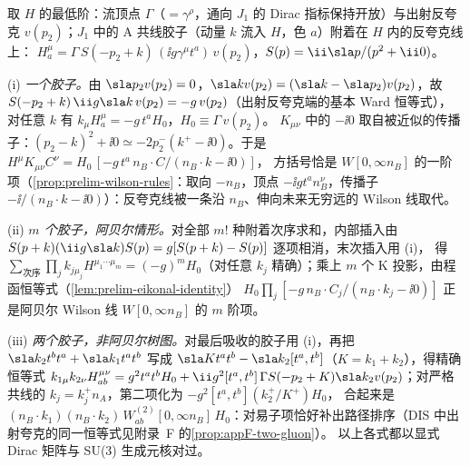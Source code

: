 \begin{example}\label{ex:sudakov-ward-wilson}
取 $H$ 的最低阶：流顶点 $\Gamma$（$=\gamma^\rho$，通向 $J_1$ 的 Dirac 指标保持开放）与出射反夸克 $v(p_2)$；$J_1$ 中的 A 共线胶子（动量 $k$ 流入 $H$，色 $a$）附着在 $H$ 内的反夸克线上：
$H^\mu_a=\Gamma\,S(-p_2+k)\,(\ii g\gamma^\mu t^a)\,v(p_2)$，$S(p)=\ii\sla p/(p^2+\ii0)$。

(i) \emph{一个胶子。}由 $\sla p_2v(p_2)=0$，$\sla kv(p_2)=(\sla k-\sla p_2)v(p_2)$，故 $S(-p_2+k)\,\ii g\sla k\,v(p_2)=-g\,v(p_2)$（出射反夸克端的基本 Ward 恒等式），
对任意 $k$ 有 $k_\mu H^\mu_a=-g\,t^aH_0$，$H_0\equiv\Gamma\,v(p_2)$。%
$K_{\mu\nu}$ 中的 $-\ii0$ 取自被近似的传播子：$(p_2-k)^2+\ii0\simeq-2p_2^-(k^+-\ii0)$。于是 $H^\mu K_{\mu\nu}C^\nu=H_0\,[-g\,t^a\,n_B\!\cdot\!C/(n_B\cdot k-\ii0)]$，
方括号恰是 $W[0,\infty n_B]$ 的一阶项（\cref{prop:prelim-wilson-rules}：取向 $-n_B$，顶点 $-\ii gt^an_B^\nu$，传播子 $-\ii/(n_B\cdot k-\ii0)$）：反夸克线被一条沿 $n_B$、伸向未来无穷远的 Wilson 线取代。

(ii) \emph{$m$ 个胶子，阿贝尔情形。}对全部 $m!$ 种附着次序求和，内部插入由 $S(p+k)(\ii g\sla k)S(p)=g[S(p+k)-S(p)]$ 逐项相消，末次插入用 (i)，
得 $\sum_{\text{次序}}\prod_jk_{j\mu_j}H^{\mu_1\cdots\mu_m}=(-g)^mH_0$（对任意 $k_j$ 精确）；乘上 $m$ 个 K 投影，由程函恒等式（\cref{lem:prelim-eikonal-identity}）
$H_0\prod_j[-g\,n_B\cdot C_j/(n_B\cdot k_j-\ii0)]$ 正是阿贝尔 Wilson 线 $W[0,\infty n_B]$ 的 $m$ 阶项。

(iii) \emph{两个胶子，非阿贝尔树图。}对最后吸收的胶子用 (i)，再把 $\sla k_2t^bt^a+\sla k_1t^at^b$ 写成 $\sla Kt^at^b-\sla k_2[t^a,t^b]$（$K=k_1+k_2$），得精确恒等式
$k_{1\mu}k_{2\nu}H^{\mu\nu}_{ab}=g^2t^at^bH_0+\ii g^2[t^a,t^b]\,\Gamma S(-p_2+K)\sla k_2v(p_2)$；对严格共线的 $k_j=k_j^+n_A$，第二项化为 $-g^2[t^a,t^b](k_2^+/K^+)H_0$，
合起来是 $(n_B\!\cdot\!k_1)(n_B\!\cdot\!k_2)\,W^{(2)}_{ab}[0,\infty n_B]\,H_0$：对易子项恰好补出路径排序（DIS 中出射夸克的同一恒等式见附录~F 的\cref{prop:appF-two-gluon}）。
以上各式都以显式 Dirac 矩阵与 SU(3) 生成元核对过。%
\end{example}


